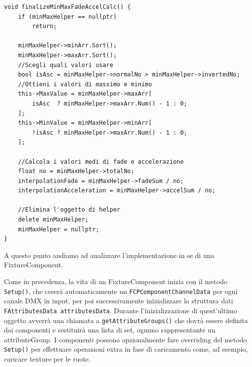 \documentclass[main.tex]{subfiles}
\begin{document}
\begin{lstlisting}
void finalizeMinMaxFadeAccelCalc() {
    if (minMaxHelper == nullptr)
        return;
    
    minMaxHelper->minArr.Sort();
    minMaxHelper->maxArr.Sort();
    //Scegli quali valori usare
    bool isAsc = minMaxHelper->normalNo > minMaxHelper->invertedNo;
    //Ottieni i valori di massimo e minimo
    this->MaxValue = minMaxHelper->maxArr[
        isAsc  ? minMaxHelper->maxArr.Num() - 1 : 0;
    ];
    this->MinValue = minMaxHelper->minArr[
        !isAsc ? minMaxHelper->maxArr.Num() - 1 : 0;
    ];

    //Calcola i valori medi di fade e accelerazione
    float no = minMaxHelper->totalNo;
    interpolationFade = minMaxHelper->fadeSum / no;
    interpolationAcceleration = minMaxHelper->accelSum / no;

    //Elimina l'oggetto di helper
    delete minMaxHelper;
    minMaxHelper = nullptr;
}
\end{lstlisting}

A questo punto andiamo ad analizzare l'implementazione in se di una FixtureComponent.\newline

Come in precedenza, la vita di un FixtureComponent inizia con il metodo \lstinline{Setup()}, che creerà automaticamente un \lstinline{FCPComponentChannelData} per ogni canale DMX in input, per poi successivamente inizializzare la struttura dati \lstinline{FAttributesData attributesData}. Durante l'inizializzazione di quest'ultimo oggetto avverrà una chiamata a \lstinline{getAttributeGroups()} che dovrà essere definita dai componenti e restituirà una lista di set, ognuno rappresentante un attributeGroup. I componenti possono opzionalmente fare overriding del metodo \lstinline{Setup()} per effettuare operazioni extra in fase di caricamento come, ad esempio, caricare texture per le ruote.
\end{document}
